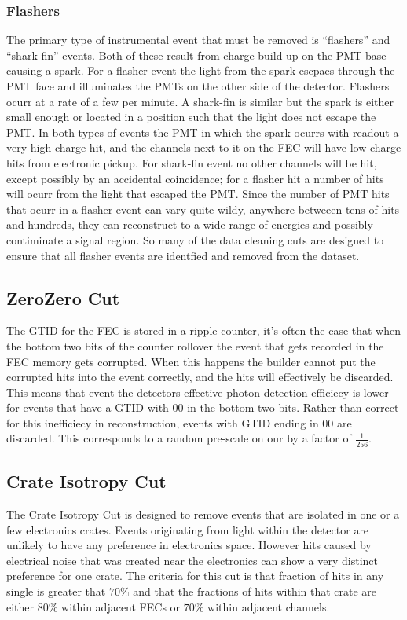 \subsubsection{Flashers}
The primary type of instrumental event that must be removed is ``flashers'' and
``shark-fin'' events.
Both of these result from charge build-up on the PMT-base causing a
spark.
For a flasher event the light from the spark escpaes through the PMT face
and illuminates the PMTs on the other side of the detector.
Flashers ocurr at a rate of a few per minute.
A shark-fin is similar but the spark is either small enough or located
in a position such that the light does not escape the PMT.
In both types of events the PMT in which the spark ocurrs with readout
a very high-charge hit, and the channels next to it on the FEC will
have low-charge hits from electronic pickup.
For shark-fin event no other channels will be hit, except possibly by an
accidental coincidence; for a flasher hit a number of hits will
ocurr from the light that escaped the PMT.
Since the number of PMT hits that ocurr in a flasher event can vary quite wildy,
anywhere betweeen tens of hits and hundreds, they can reconstruct
to a wide range of energies and possibly contiminate a signal region.
So many of the data cleaning cuts are designed to ensure that all
flasher events are identfied and removed from the dataset.

\subsection{ZeroZero Cut}
The GTID for the FEC is stored in a ripple counter, it's often the case that
when the bottom two bits of the counter rollover the event that gets recorded in
the FEC memory gets corrupted.
When this happens the builder cannot put the corrupted hits into the event correctly,
and the hits will effectively be discarded.
This means that event the detectors effective photon detection efficiecy is lower
for events that have a GTID with $00$ in the bottom two bits.
Rather than correct for this inefficiecy in reconstruction, events with GTID
ending in $00$ are discarded. This corresponds to a random pre-scale
on our by a factor of $\frac{1}{256}$.
\subsection{Crate Isotropy Cut}
The Crate Isotropy Cut is designed to remove events that are isolated
in one or a few electronics crates.
Events originating from light within the detector are unlikely to have any
preference in electronics space.
However hits caused by electrical noise that was created near the electronics
can show a very distinct preference for one crate.
The criteria for this cut is that fraction of hits in any single
is greater that $70\%$ and that the fractions of hits within
that crate are either $80\%$ within adjacent FECs or $70\%$ within
adjacent channels.
